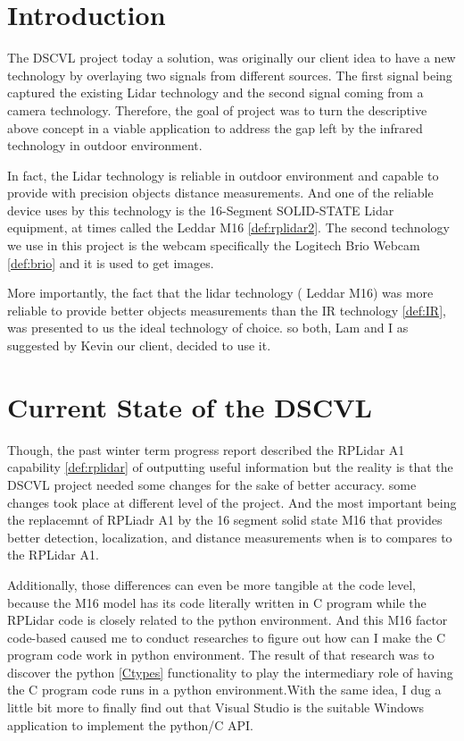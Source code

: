 \documentclass[onecolumn, draftclsnofoot,10pt, compsoc]{IEEEtran}
\begin{document}
		
		
	\section{Introduction}
	The DSCVL project today a solution, was originally our client idea to have  a new technology by overlaying two signals from different sources. The first signal  being captured the existing Lidar technology and the second signal coming from a camera technology. Therefore, the goal of project was to turn the descriptive above concept in a viable application to address the gap left by the infrared technology in outdoor environment.
	
 In fact, the Lidar technology is  reliable in outdoor environment and capable to provide with precision objects distance measurements. And one of the reliable device uses by this technology is the  16-Segment SOLID-STATE Lidar equipment, at times called the Leddar M16 \ref{def:rplidar2}. The second technology we use in this project is the  webcam  specifically the Logitech Brio Webcam \ref{def:brio} and it is used to get images.  
  
More importantly, the fact that the lidar technology ( Leddar M16) was more reliable to provide better objects measurements than the IR technology \ref{def:IR}, was presented to us the ideal technology of choice. so both, Lam and I as suggested by Kevin our client, decided to use it.

\section{Current State of the DSCVL}
Though, the past winter term progress report described the RPLidar A1 capability  \ref{def:rplidar} of outputting  useful information but the reality is that the DSCVL project  needed some changes for the sake of better accuracy. some changes took place at different level of the project. And the most important being the replacemnt of RPLiadr A1 by the 16 segment solid state M16 that provides better detection, localization, and distance measurements when is to compares to the RPLidar A1.\par

Additionally, those differences can even be more tangible at the code level, because the M16 model has its code literally written in C program while the RPLidar code is closely related to the python environment. And this M16 factor code-based caused me to conduct researches to figure out how can I make the C program code work in python environment. The result of that research was to discover the python \ref{Ctypes} functionality to play the intermediary role of having the C program code runs in a python environment.With the same idea, I dug a little bit more to finally find out that Visual Studio is the suitable Windows application to implement the python/C API.  
\end{document}
